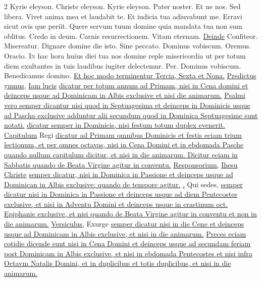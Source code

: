 \begin{multicols*}{2}
\newline Kyrie eleyson. Christe eleyson. Kyrie eleyson. Pater noster. Et ne nos. Sed libera. \V Vivet anima mea et laudabit te. Et iudicia tua adiuvabunt me. \V Erravi sicut ovis que periit. Quere servum tuum domine quia mandata tua non sum oblitus. Credo in deum. Carnis resurrectionem. Vitam eternam. \ul{Deinde} Confiteor. Misereatur. \V Dignare domine die isto. Sine peccato. Dominus vobiscum. Oremus. {\color{Red} Oracio.}
\lettrine[lines=2]{\zallmancaps \color{Red} I}{n} \hypertarget{in-hac-hora}{\label{in-hac-hora}} hac hora huius diei tua nos domine reple misericordia ut per totum diem exultantes in tuis laudibus iugiter delectemur. Per. Dominus vobiscum. Benedicamus domino. \ul{Et hoc modo terminentur Tercia, Sexta et Nona.}
\newline \ul{Predictus ymnus,} \hyperlink{iam-lucis}{Iam lucis} \ul{dicatur per totum annum ad Primam, nisi in Cena domini et deinceps usque ad Dominicam in Albis exclusive et nisi die animarum.}
\newline \ul{Psalmi vero semper dicantur nisi quod in Septuagesima et deinceps in Dominicis usque ad Pascha exclusive adduntur alii secundum quod in Dominica Septuagesime sunt notati.}
\newline {} \ul{dicatur semper in Dominicis, nisi festum totum duplex evenerit.}
\newline \ul{Capitulum} Regi \ul{dicatur ad Primam omnibus Dominicis et festis eciam trium lectionum, et per omnes octavas, nisi in Cena Domini et in ebdomada Pasche quando nullum capitulum dicitur, et nisi in die animarum. Dicitur eciam in Sabbatis quando de Beata Virgine agitur in conventu.}
\newline \ul{Responsorium,} \hyperlink{ihesu-christe-fili}{Ihesu Christe} \ul{semper dicatur, nisi in Dominica in Passione et deinceps usque ad Dominican in Albis exclusive: quando de tempore agitur.}
\newline \ul{\Vbar .} Qui sedes, \ul{semper dicatur nisi in Dominica in Passione et deinceps usque ad diem Pentecostes exclusive, et nisi in Adventu Domini et deinceps usque in crastinum oct. Epiphanie exclusive, et nisi quando de Beata Virgine agitur in conventu et non in die animarum.}
\newline \ul{Versiculus,} Exurge \ul{semper dicatur nisi in die Cene et deinceps usque ad Dominicam in Albis exclusive, et nisi in die animarum.}
\newline \ul{Preces eciam cotidie dicende sunt nisi in Cena Domini et deinceps usque ad secundam feriam post Dominicam in Albis exclusive, et nisi in ebdomada Pentecostes et nisi infra Octavm Natalis Domini, et in duplicibus et totis duplicibus, et nisi in die animarum.}

\end{multicols*}
